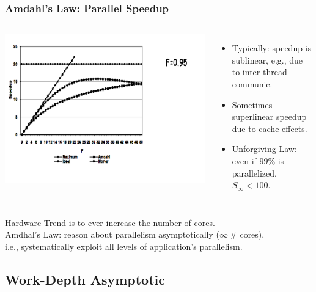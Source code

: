 \documentclass{beamer}
\begin{document}
\begin{frame}[fragile,t]
\frametitle{Amdahl's Law: Parallel Speedup}

\medskip

\begin{columns}
\includegraphics[width=44ex]{Figures/L1/ParSpeedup}
\vspace{-5ex}
\begin{itemize}
    \item Typically: speedup is sublinear, e.g., due to inter-thread communic. 
    \item Sometimes superlinear speedup due to cache effects.
    \item Unforgiving Law: even if $99\%$ is parallelized, $S_{\infty} < 100$.
\end{itemize}
\end{columns}

\pause
\vspace{-3ex}

Hardware Trend is to ever increase the number of cores.\\
\alert{Amdhal's Law: reason about parallelism asymptotically ($\infty \ \#$ cores),\\
i.e., systematically exploit all levels of application's parallelism.}

\end{frame}

\subsection{Work-Depth Asymptotic}

\begin{frame}[fragile]
	\tableofcontents[currentsubsection]
\end{frame}
\end{document}
